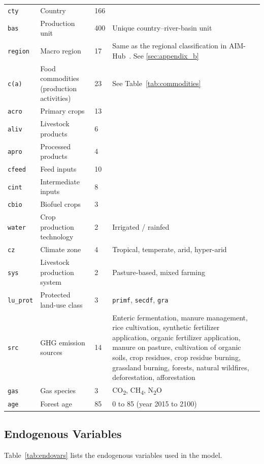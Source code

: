 \begin{xltabular}{\linewidth}{l X l X}
  \texttt{cty}    & Country & 166 & \\
  \texttt{bas}    & Production unit & 400 & Unique country--river-basin unit \\
  \texttt{region} & Macro region     & 17  & Same as the regional classification in AIM-Hub~\cite{fujimoriSSP3AIMImplementation2017}. See \cref{sec:appendix_b} \\
  \texttt{c(a)}   & Food commodities (production activities) & 23 & See Table~\ref{tab:commodities} \\
  \texttt{acro}   & Primary crops    & 13  & \\
  \texttt{aliv}   & Livestock products & 6 & \\
  \texttt{apro}   & Processed products & 4 & \\
  \texttt{cfeed}  & Feed inputs      & 10  & \\
  \texttt{cint}   & Intermediate inputs & 8 & \\
  \texttt{cbio}   & Biofuel crops    & 3   & \\
  \texttt{water}  & Crop production technology & 2 & Irrigated / rainfed \\
  \texttt{cz}     & Climate zone     & 4 & Tropical, temperate, arid, hyper-arid \\
  \texttt{sys}    & Livestock production system & 2 & Pasture-based, mixed farming \\
  \texttt{lu\_prot} & Protected land-use class & 3 & \texttt{primf}, \texttt{secdf}, \texttt{gra} \\
  \texttt{src}    & GHG emission sources & 14 &
    Enteric fermentation, manure management, rice cultivation, synthetic fertilizer application, 
    organic fertilizer application, manure on pasture, cultivation of organic soils, crop residues, 
    crop residue burning, grassland burning, forests, natural wildfires, deforestation, afforestation \\
  \texttt{gas}    & Gas species      & 3 & CO\textsubscript{2}, CH\textsubscript{4}, N\textsubscript{2}O \\
  \texttt{age}    & Forest age      & 85 & 0 to 85 (year 2015 to 2100)\\
\end{xltabular}




\subsection{Endogenous Variables}
Table~\ref{tab:endovars} lists the endogenous variables used in the model.

